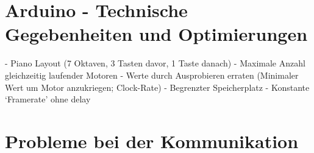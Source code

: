 \section{Arduino - Technische Gegebenheiten und Optimierungen}
- Piano Layout (7 Oktaven, 3 Tasten davor, 1 Taste danach)\newline
- Maximale Anzahl gleichzeitig laufender Motoren\newline
- Werte durch Ausprobieren erraten (Minimaler Wert um Motor anzukriegen; Clock-Rate)\newline
- Begrenzter Speicherplatz\newline
- Konstante ‘Framerate’ ohne delay

\section{Probleme bei der Kommunikation}